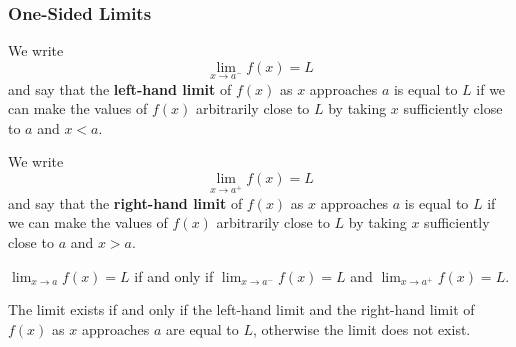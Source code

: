 \subsubsection*{One-Sided Limits}
\begin{definition}
    We write
    \[\lim_{x\to a^-}f(x)=L\]
    and say that the \textbf{left-hand limit} of \(f(x)\) as \(x\) approaches
    \(a\) is equal to \(L\) if we can make the values of \(f(x)\) arbitrarily
    close to \(L\) by taking \(x\) sufficiently close to \(a\) and \(x<a\).
\end{definition}
\begin{definition}
    We write
    \[\lim_{x\to a^+}f(x)=L\]
    and say that the \textbf{right-hand limit} of \(f(x)\) as \(x\) approaches
    \(a\) is equal to \(L\) if we can make the values of \(f(x)\) arbitrarily
    close to \(L\) by taking \(x\) sufficiently close to \(a\) and \(x>a\).
\end{definition}
\begin{theorem}
    \(\displaystyle{\lim_{x\to a}f(x)=L}\) if and only if
    \(\displaystyle{\lim_{x\to a^-}f(x)}=L\) and
    \(\displaystyle{\lim_{x\to a^+}f(x)}=L\).
\end{theorem}
The limit exists if and only if the left-hand limit and the right-hand limit of \(f(x)\)
as \(x\) approaches \(a\) are equal to \(L\),
otherwise the limit does not exist.